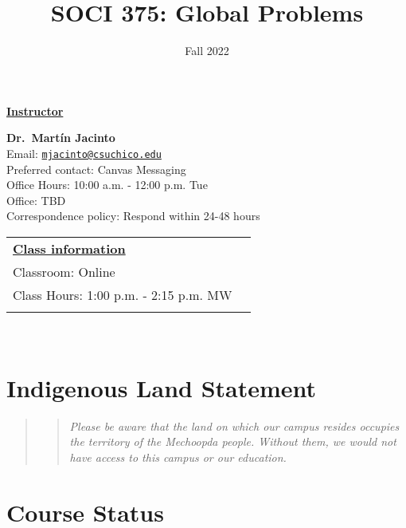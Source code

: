 \documentclass[11pt,]{article}
\title{SOCI 375: Global Problems}
\date{Fall 2022}
\begin{document}
  

		\maketitle
		
	
		\thispagestyle{firststyle}

\textbf{\underline{Instructor}}
\begin{multicols}{2}

  \textbf{Dr.~Martín Jacinto}\\
  Email: \href{mailto:mjacinto@csuchico.edu}{\nolinkurl{mjacinto@csuchico.edu}}\\
  Preferred contact: Canvas Messaging\\
  Office Hours: 10:00 a.m. - 12:00 p.m. Tue\\
  Office: TBD\\
  Correspondence policy: Respond within 24-48 hours\\
    \columnbreak
    
  \end{multicols}
	
\noindent \begin{tabular*}{\textwidth}{ @{\extracolsep{\fill}} lr @{\extracolsep{\fill}}}
\textbf{\underline{Class information}}\\
  Classroom: Online\\
  Class Hours: 1:00 p.m. - 2:15 p.m. MW\\
    \\
	\end{tabular*}\\


\vspace{2mm}


\hypertarget{indigenous-land-statement}{%
\section{Indigenous Land Statement}\label{indigenous-land-statement}}

\begin{quote}
\begin{quote}
\emph{Please be aware that the land on which our campus resides occupies
the territory of the Mechoopda people. Without them, we would not have
access to this campus or our education.}
\end{quote}
\end{quote}

\hypertarget{course-status}{%
\section{Course Status}\label{course-status}}
\end{document}
